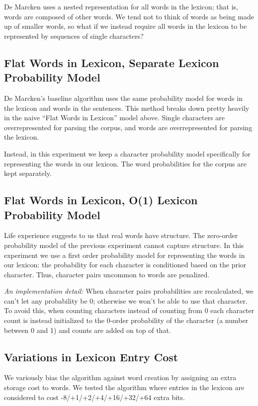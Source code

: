 \documentclass[11pt, oneside, fleqn]{article}
\begin{document}
  De Marcken uses a nested representation for all words in the lexicon; that is, words are composed of other words. We tend not to think of words as being made up of smaller words, so what if we instead require all words in the lexicon to be represented by sequences of single characters?

  \subsection{Flat Words in Lexicon, Separate Lexicon Probability Model}

	De Marcken's baseline algorithm uses the same probability model for words in the lexicon and words in the sentences. This method breaks down pretty heavily in the naive ``Flat Words in Lexicon'' model above. Single characters are overrepresented for parsing the corpus, and words are overrepresented for parsing the lexicon.
	
	Instead, in this experiment we keep a character probability model specifically for representing the words in our lexicon. The word probabilities for the corpus are kept separately.

  \subsection{Flat Words in Lexicon, O(1) Lexicon Probability Model}

	Life experience suggests to us that real words have structure. The zero-order probability model of the previous experiment cannot capture structure. In this experiment we use a first order probability model for representing the words in our lexicon: the probability for each character is conditioned based on the prior character. Thus, character pairs uncommon to words are penalized.
	
	\textit{An implementation detail:} When character pairs probabilities are recalculated, we can't let any probability be 0; otherwise we won't be able to use that character. To avoid this, when counting characters instead of counting from 0 each character count is instead initialized to the 0-order probability of the character (a number between 0 and 1) and counts are added on top of that.

	\subsection{Variations in Lexicon Entry Cost}
	
	We variously bias the algorithm against word creation by assigning an extra storage cost to words. We tested the algorithm where entries in the lexicon are considered to cost -8/+1/+2/+4/+16/+32/+64 extra bits.
\end{document}
